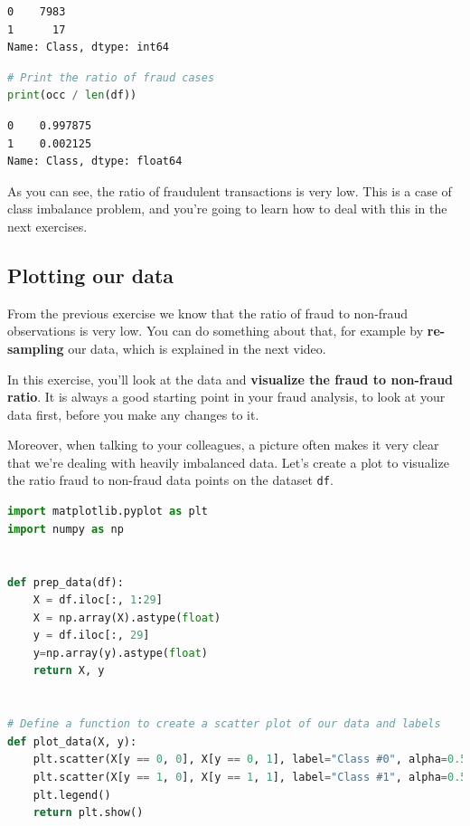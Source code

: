 \begin{lstlisting}[language={bash}]
0    7983
1      17
Name: Class, dtype: int64
\end{lstlisting}

\begin{lstlisting}[language={python}]
# Print the ratio of fraud cases
print(occ / len(df))
\end{lstlisting}

\begin{lstlisting}[language={bash}]
0    0.997875
1    0.002125
Name: Class, dtype: float64
\end{lstlisting}

As you can see, the ratio of fraudulent transactions is very low. This is a case of class imbalance problem, and you're going to learn how to deal with this in the next exercises.

\subsection{Plotting our data}

From the previous exercise we know that the ratio of fraud to non-fraud observations is very low. You can do something about that, for example by \textbf{re-sampling} our data, which is explained in the next video.

In this exercise, you'll look at the data and \textbf{visualize the fraud to non-fraud ratio}. It is always a good starting point in your fraud analysis, to look at your data first, before you make any changes to it.

Moreover, when talking to your colleagues, a picture often makes it very clear that we're dealing with heavily imbalanced data. Let's create a plot to visualize the ratio fraud to non-fraud data points on the dataset \lstinline!df!.

\begin{lstlisting}[language={python}]
import matplotlib.pyplot as plt
import numpy as np


def prep_data(df):
    X = df.iloc[:, 1:29]
    X = np.array(X).astype(float)
    y = df.iloc[:, 29]
    y=np.array(y).astype(float)
    return X, y


# Define a function to create a scatter plot of our data and labels
def plot_data(X, y):
    plt.scatter(X[y == 0, 0], X[y == 0, 1], label="Class #0", alpha=0.5, linewidth=0.15)
    plt.scatter(X[y == 1, 0], X[y == 1, 1], label="Class #1", alpha=0.5, linewidth=0.15, c='r')
    plt.legend()
    return plt.show()
\end{lstlisting}

